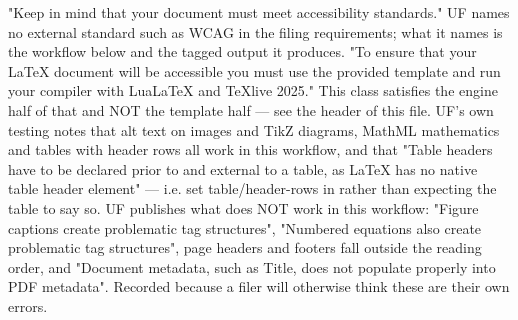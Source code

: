 %
%
%
%
\thesisrequiretagging
\thesisrequiredocumentlanguage
{}
	{"Keep in mind that your document must meet accessibility standards."
	 UF names no external standard such as WCAG in the filing requirements; what
	 it names is the workflow below and the tagged output it produces.}
	{"To ensure that your LaTeX document will be accessible you must use the
	 provided template and run your compiler with LuaLaTeX and TeXlive 2025."
	 This class satisfies the engine half of that and NOT the template half —
	 see the header of this file.}
	{UF's own testing notes that alt text on images and TikZ diagrams, MathML
	 mathematics and tables with header rows all work in this workflow, and
	 that "Table headers have to be declared prior to and external to a table,
	 as LaTeX has no native table header element" — i.e. set table/header-rows
	 in \string\DocumentMetadata rather than expecting the table to say so.}
	{UF publishes what does NOT work in this workflow: "Figure captions create
	 problematic tag structures", "Numbered equations also create problematic
	 tag structures", page headers and footers fall outside the reading order,
	 and "Document metadata, such as Title, does not populate properly into PDF
	 metadata". Recorded because a filer will otherwise think these are their
	 own errors.}

